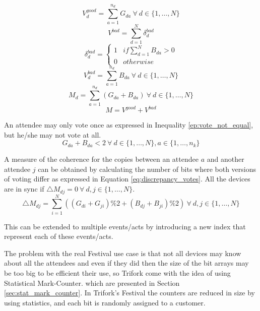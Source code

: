 \begin{equation} \label{eq:local_total_good_votes}
	V^{good}_{d}  = \sum^{n_{d}}_{a=1} G_{da} ~ \forall ~ d \in \{1,\dots, N\}
\end{equation}
\begin{equation} \label{eq:total_bad_votes}
	V^{bad}  = \sum^{N}_{d=1} \delta^{bad}_{d}
\end{equation}
\begin{equation} \label{attendee_voted_bad}
	\delta^{bad}_{d} = \left\{\begin{array}{ll}
			1 & if \sum^{N}_{d=1} B_{da} > 0\\
			0 & otherwise
		\end{array}
	\right.
\end{equation}
\begin{equation} \label{eq:local_total_bad_votes}
	V^{bad}_{d}  = \sum^{n_{d}}_{a=1} B_{da} ~ \forall ~ d \in \{1,\dots, N\}
\end{equation}
\begin{equation} \label{eq:num_votes}
	M_{d}  = \sum^{n_{d}}_{a=1} (G_{da} + B_{da}) ~ \forall ~ d \in \{1,\dots, N\}
\end{equation}
\begin{equation} \label{eq:total_num_votes}
	M  = V^{good} + V^{bad}
\end{equation}

An attendee may only vote once as expressed in Inequality \ref{ep:vote_not_equal}, but he/she may not vote at all.
\begin{equation} \label{ep:vote_not_equal}
	G_{da} + B_{da} < 2 ~ \forall ~ d \in \{1,\dots, N\}, a \in \{1,\dots, n_{k}\}
\end{equation}

A measure of the coherence for the copies between an attendee $a$ and another attendee $j$ can be obtained by calculating the number of bits where both versions of voting differ as expressed in Equation \ref{eq:discrepancy_votes}. All the devices are in sync if $\bigtriangleup M_{dj} = 0 ~ \forall ~ d, j \in \{1,\dots, N\}$.
\begin{equation} \label{eq:discrepancy_votes}
	\bigtriangleup M_{dj} = \sum^{N}_{i = 1} ((G_{di} + G_{ji}) \% 2 + (B_{dj} + B_{ji}) \% 2) ~ \forall ~ d, j \in \{1,\dots, N\}
\end{equation}

This can be extended to multiple events/acts by introducing a new index that represent each of these events/acts.

The problem with the real Festival use case is that not all devices may know about all the attendees and even if they did then the size of the bit arrays may be too big to be efficient their use, so Trifork come with the idea of using Statistical Mark-Counter. which are presented in Section \ref{sec:stat_mark_counter}. In Trifork's Festival the counters are reduced in size by using statistics, and each bit is randomly assigned to a customer.

